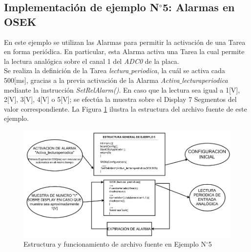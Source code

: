 \documentclass[12pt,letterpaper]{article}
\begin{document}
\subsection{Implementación de ejemplo N$^{\circ}$5: Alarmas en OSEK}
En este ejemplo se utilizan las Alarmas para permitir la activación de una Tarea en forma periódica. En particular, esta Alarma activa una Tarea la cual permite la lectura analógica sobre el canal 1 del \textit{ADC0} de la placa.
  \\
  
Se realiza la definición de la Tarea \textit{lectura$\_$periodica}, la cuál se activa cada 500[ms], gracias a la previa activación de la Alarma \textit{Activa$\_$lecturaperiodica} mediante la instrucción \textit{SetRelAlarm()}. En caso que la lectura sea igual a 1[V], 2[V], 3[V], 4[V] o 5[V]; se efectúa la muestra sobre el Display 7 Segmentos del valor correspondiente. La Figura \ref{estructuraej5} ilustra la estructura del archivo fuente de este ejemplo.
\begin{figure}[H]
\centering
\includegraphics[width=15 cm]{figuras/f36.png}
\caption{Estructura y funcionamiento de archivo fuente en Ejemplo N$^{\circ}$5}
\label{estructuraej5}
\end{figure}
\end{document}
